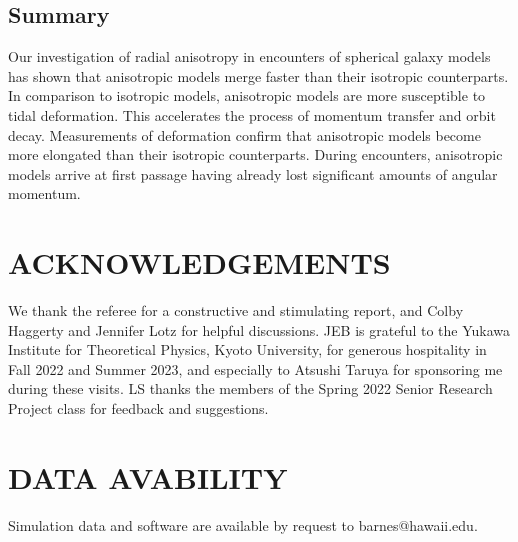 \documentclass[fleqn,usenatbib]{mnras}
\begin{document}
\subsection{Summary}
\label{Summary}

Our investigation of radial anisotropy in encounters of spherical galaxy models has shown that anisotropic models merge faster than their isotropic counterparts. In comparison to isotropic models, anisotropic models are more susceptible to tidal deformation. This accelerates the process of momentum transfer and orbit decay. Measurements of deformation confirm that anisotropic models become more elongated than their isotropic counterparts. During encounters, anisotropic models arrive at first passage having already lost significant amounts of angular momentum.

\section*{ACKNOWLEDGEMENTS}

We thank the referee for a constructive and stimulating report, and Colby Haggerty and Jennifer Lotz for helpful discussions. JEB is grateful to the Yukawa Institute for Theoretical Physics, Kyoto University, for generous hospitality in Fall 2022 and Summer 2023, and especially to Atsushi Taruya for sponsoring me during these visits. LS thanks the members of the Spring 2022 Senior Research Project class for feedback and suggestions.

\section*{DATA AVABILITY}

Simulation data and software are available by request to barnes@hawaii.edu.
\end{document}
